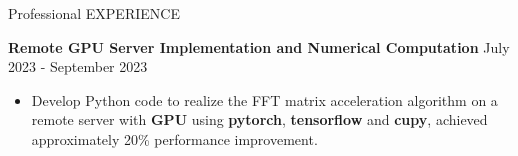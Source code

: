 \begin{rSection}{Professional EXPERIENCE}
    
\textbf{Remote GPU Server Implementation and Numerical Computation} \hfill July 2023 - September 2023

\vspace{-5pt}

    
\begin{itemize}

    \item Develop Python code to realize the FFT matrix acceleration algorithm
on a remote server with \textbf{GPU} using \textbf{pytorch}, \textbf{tensorflow} and \textbf{cupy}, achieved approximately 20\% performance improvement.
\end{itemize}





\end{rSection} 
